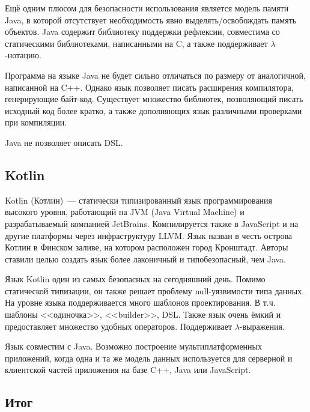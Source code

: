 Ещё одним плюсом для безопасности использования является модель памяти Java, в которой отсутствует необходимость явно выделять/освобождать память объектов. 
Java содержит библиотеку поддержки рефлексии, совместима со статическими библиотеками, написанными на C, а также поддерживает $ \lambda $-нотацию.

Программа на языке Java не будет сильно отличаться по размеру от аналогичной, написанной на C++. 
Однако язык позволяет писать расширения компилятора, генерирующие байт-код. 
Существует множество библиотек, позволяющий писать исходный код более кратко, а также дополняющих язык различными проверками при компиляции.

Java не позволяет описать DSL.

\subsection{Kotlin}

Kotlin (Котлин)~--- статически типизированный язык программирования высокого уровня, работающий на JVM (Java Virtual Machine) и разрабатываемый компанией JetBrains. 
Компилируется также в JavaScript и на другие платформы через инфраструктуру LLVM. 
Язык назван в честь острова Котлин в Финском заливе, на котором расположен город Кронштадт.
Авторы ставили целью создать язык более лаконичный и типобезопасный, чем Java. 

Язык Kotlin один из самых безопасных на сегодняшний день.\cite{vakhitov2016}
Помимо статической типизации, он также решает проблему null-уязвимости типа данных.
На уровне языка поддерживается много шаблонов проектирования.
В т.ч. шаблоны <<одиночка>>, <<builder>>, DSL.
Также язык очень ёмкий и предоставляет множество удобных операторов.
Поддерживает $ \lambda $-выражения.

Язык совместим с Java.
Возможно построение мультиплатформенных приложений, когда одна и та же модель данных используется для серверной и клиентской частей приложения на базе C++, Java или JavaScript.

\subsection{Итог}

